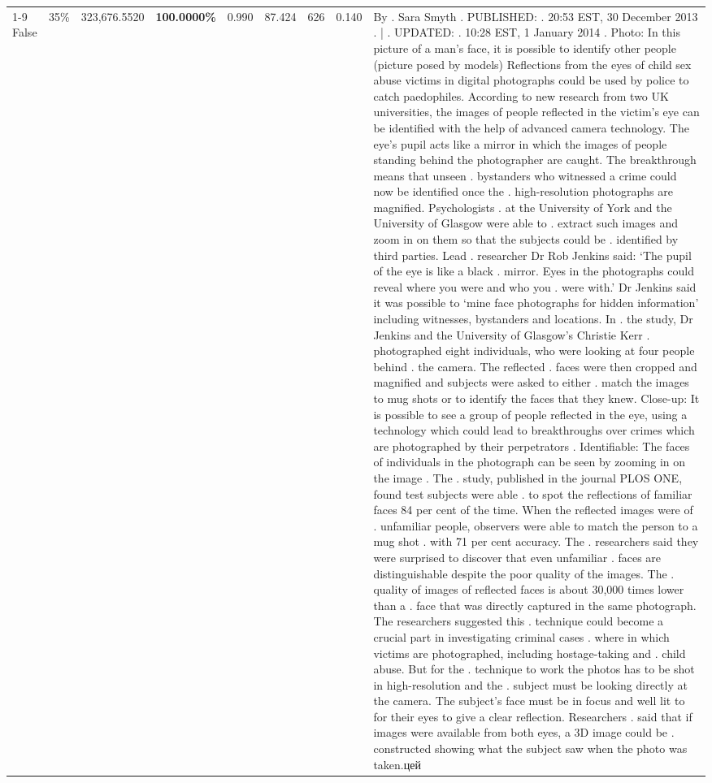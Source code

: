 \begin{table}[H]
\begin{tabular}{lllrlllll}
\cline{1-9} \cline{2-9}
False & 35\% & 323,676.5520 & \bfseries \color{red} 100.0000\% & 0.990 & 87.424 & 626 & 0.140 & By . Sara Smyth . PUBLISHED: . 20:53 EST, 30 December 2013 . | . UPDATED: . 10:28 EST, 1 January 2014 . Photo: In this picture of a man's face, it is possible to identify other people (picture posed by models) Reflections from the eyes of child sex abuse victims in digital photographs could be used by police to catch paedophiles. According to new research from two UK universities, the images of people reflected in the victim's eye can be identified with the help of advanced camera technology. The eye's pupil acts like a mirror in which the images of people standing behind the photographer are caught. The breakthrough means that unseen . bystanders who witnessed a crime could now be identified once the . high-resolution photographs are magnified. Psychologists . at the University of York and the University of Glasgow were able to . extract such images and zoom in on them so that the subjects could be . identified by third parties. Lead . researcher Dr Rob Jenkins said: ‘The pupil of the eye is like a black . mirror. Eyes in the photographs could reveal where you were and who you . were with.' Dr Jenkins said it was possible to ‘mine face photographs for hidden information' including witnesses, bystanders and locations. In . the study, Dr Jenkins and the University of Glasgow's Christie Kerr . photographed eight individuals, who were looking at four people behind . the camera. The reflected . faces were then cropped and magnified and subjects were asked to either . match the images to mug shots or to identify the faces that they knew. Close-up: It is possible to see a group of people reflected in the eye, using a technology which could lead to breakthroughs over crimes which are photographed by their perpetrators . Identifiable: The faces of individuals in the photograph can be seen by zooming in on the image . The . study, published in the journal PLOS ONE, found test subjects were able . to spot the reflections of familiar faces 84 per cent of the time. When the reflected images were of . unfamiliar people, observers were able to match the person to a mug shot . with 71 per cent accuracy. The . researchers said they were surprised to discover that even unfamiliar . faces are distinguishable despite the poor quality of the images. The . quality of images of reflected faces is about 30,000 times lower than a . face that was directly captured in the same photograph. The researchers suggested this . technique could become a crucial part in investigating criminal cases . where in which victims are photographed, including hostage-taking and . child abuse. But for the . technique to work the photos has to be shot in high-resolution and the . subject must be looking directly at the camera. The subject's face must be in focus and well lit to for their eyes to give a clear reflection. Researchers . said that if images were available from both eyes, a 3D image could be . constructed showing what the subject saw when the photo was taken.цей \\

\end{tabular}
\end{table}
